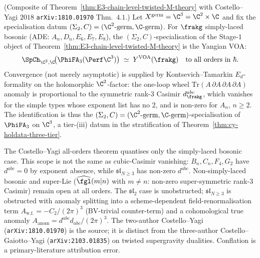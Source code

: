\begin{proposition}
\label{prop:costello-yagi-as-spch}
\textup{(}Composite of Theorem~\ref{thm:E3-chain-level-twisted-M-theory} with
Costello--Yagi $2018$ \texttt{arXiv:1810.01970} Thm.~$4.1$.\textup{)}
Let $X^{\mathrm{germ}} = \C^3 = \C^2 \times \C$ and fix the
specialisation datum $(\Sigma_2, C) = (\C^2\text{-germ}, \C\text{-germ})$.
For $\frakg$ simply-laced bosonic (\textup{ADE:} $A_n, D_n, E_6, E_7,
E_8$), the $(\Sigma_2, C)$-specialisation of the Stage-$1$ object of
Theorem~\ref{thm:E3-chain-level-twisted-M-theory} is the Yangian VOA:
\[
 \SpCh_{\C^2, \C}\!\bigl(\PhiFA_3(\Perf \C^3)\bigr)
 \;\simeq\;
 Y^{\mathrm{VOA}}(\frakg)
 \quad\textup{to all orders in } \hbar.
\]
Convergence (not merely asymptotic) is supplied by Kontsevich--Tamarkin
$E_d$-formality on the holomorphic $\C^2$-factor: the one-loop wheel
$\mathrm{Tr}(A\,\partial A\,\partial A\,\partial A)$ anomaly is
proportional to the symmetric rank-$3$ Casimir $d^{abc}_\frakg$, which
vanishes for the simple types whose exponent list has no $2$, and is
non-zero for $A_n$, $n\geq2$.
The identification is thus the
$(\Sigma_2, C) = (\C^2\text{-germ}, \C\text{-germ})$-specialisation of
$\PhiFA_3$ on $\C^3$, a tier-\textup{(iii)} datum in the stratification
of Theorem~\ref{thm:cy-holdata-three-tier}.
\end{proposition}

\begin{remark}
\label{rem:scope-simply-laced-bosonic-only}
The Costello--Yagi all-orders theorem quantises only the simply-laced
bosonic case. This scope is not the same as cubic-Casimir vanishing:
$B_n, C_n, F_4, G_2$ have $d^{abc}=0$ by exponent absence, while
$\mathfrak{sl}_{N \geq 3}$ has non-zero $d^{abc}$. Non-simply-laced
bosonic and super-Lie ($\widehat{\fgl}(m|n)$ with $m \neq n$: non-zero
super-symmetric rank-$3$ Casimir) remain open at all orders. The
$\mathfrak{sl}_2$ case is unobstructed; $\mathfrak{sl}_{N \geq 3}$ is
obstructed with anomaly splitting into a scheme-dependent field-renormalisation
term $A_{\mathrm{w.f.}} = -C_2/(2\pi)^3$ (BV-trivial counter-term) and
a cohomological true anomaly $A_{\mathrm{anom}} = d^{abc} d_{abc}/
(2\pi)^3$. The two-author Costello--Yagi \textup{(\texttt{arXiv:1810.01970})}
is the source; it is distinct from the three-author Costello--Gaiotto--Yagi
\textup{(\texttt{arXiv:2103.01835})} on twisted supergravity dualities. Conflation
is a primary-literature attribution error.
\end{remark}

